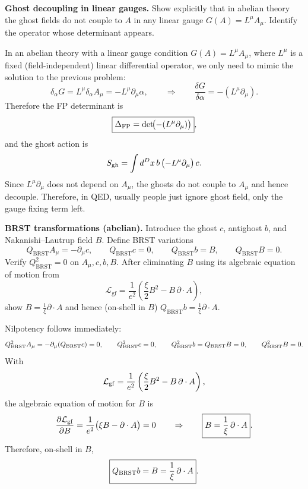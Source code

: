 \begin{problem}
    \textbf{Ghost decoupling in linear gauges.} Show explicitly that in abelian theory the ghost fields do not couple to \(A\) in any linear gauge \(G(A)=L^\mu A_\mu\). Identify the operator whose determinant appears.
\end{problem}
\begin{solution}[33.3]
	In an abelian theory with a linear gauge condition \(G(A)=L^\mu A_\mu\), where \(L^\mu\) is a fixed (field-independent) linear differential operator, we only need to mimic the solution to the previous problem: 
	\[
	\delta_\alpha G=L^\mu\delta_\alpha A_\mu= -L^\mu\partial_\mu \alpha,
	\qquad\Rightarrow\qquad
	\frac{\delta G}{\delta\alpha}=-(L^\mu\partial_\mu).
	\]
	Therefore the FP determinant is
	\[
	\boxed{
	\Delta_{\rm FP}=\det\!\bigl(-(L^\mu\partial_\mu)\bigr)},
	\]
	and the ghost action is
	\[
	S_{\rm gh}=\int d^D x\, b\,\bigl(-L^\mu\partial_\mu\bigr)\,c.
	\]
	Since \(L^\mu\partial_\mu\) does not depend on \(A_\mu\), the ghosts do not couple to \(A_\mu\) and hence decouple. Therefore, in QED, usually people just ignore ghost field, only the gauge fixing term left.
\end{solution}
\begin{problem}
    \textbf{BRST transformations (abelian).} Introduce the ghost \(c\), antighost \(b\), and Nakanishi–Lautrup field \(B\). Define BRST variations
    \[
        Q_{\text{BRST}}A_\mu=-\partial_\mu c,\qquad
        Q_{\text{BRST}}c=0,\qquad
        Q_{\text{BRST}}b=B,\qquad
        Q_{\text{BRST}}B=0.
    \]
    Verify \(Q_{\text{BRST}}^2=0\) on \(A_\mu,c,b,B\). After eliminating \(B\) using its algebraic equation of motion from
    \[
        \mathcal{L}_{\text{gf}}=\frac{1}{e^2}\left(\frac{\xi}{2}B^2-B\,\partial\cdot A\right),
    \]
    show \(B=\frac{1}{\xi}\partial\cdot A\) and hence (on-shell in \(B\)) \(Q_{\text{BRST}}b=\frac{1}{\xi}\partial\cdot A\).
\end{problem}
\begin{solution}[33.4]
	Nilpotency follows immediately:
	\[
	Q_{\rm BRST}^2A_\mu= -\partial_\mu(Q_{\rm BRST}c)=0,\qquad
	Q_{\rm BRST}^2c=0,\qquad
	Q_{\rm BRST}^2b=Q_{\rm BRST}B=0,\qquad
	Q_{\rm BRST}^2B=0.
	\]
	With
	\[
	\mathcal L_{\rm gf}=\frac{1}{e^2}\left(\frac{\xi}{2}B^2-B\,\partial\cdot A\right),
	\]
	the algebraic equation of motion for \(B\) is
	\[
	\frac{\partial\mathcal L_{\rm gf}}{\partial B}=\frac{1}{e^2}\bigl(\xi B-\partial\cdot A\bigr)=0
	\qquad\Rightarrow\qquad
	\boxed{B=\frac{1}{\xi}\,\partial\cdot A}.
	\]
	Therefore, on-shell in \(B\),
	\[
	\boxed{
	Q_{\rm BRST}b=B=\frac{1}{\xi}\,\partial\cdot A}.
	\]
\end{solution}
